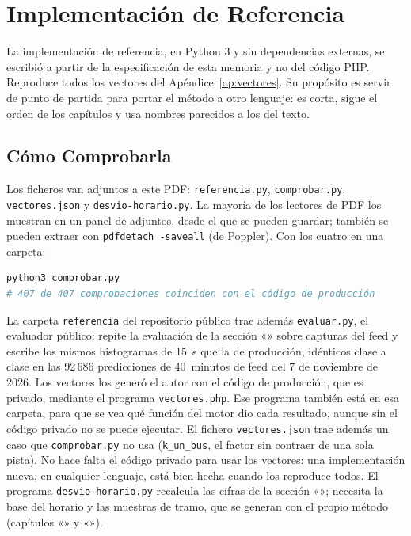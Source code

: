\chapter{Implementación de Referencia}
\label{ap:referencia}

La implementación de referencia, en Python 3 y sin dependencias externas, se escribió a partir de la especificación de
esta memoria y no del código PHP. Reproduce todos los vectores del Apéndice~\ref{ap:vectores}. Su propósito es servir
de punto de partida para portar el método a otro lenguaje: es corta, sigue el orden de los capítulos y usa nombres parecidos a los
del texto.

\section{Cómo Comprobarla}

Los ficheros van adjuntos a este PDF: \texttt{referencia.py}, \texttt{comprobar.py}, \texttt{vectores.json} y
\texttt{desvio-horario.py}. La mayoría de los lectores de PDF los muestran en un panel de adjuntos, desde el que se
pueden guardar; también se pueden extraer con \texttt{pdfdetach -saveall} (de Poppler). Con los cuatro en una carpeta:

\begin{lstlisting}[language=bash,numbers=none]
python3 comprobar.py
# 407 de 407 comprobaciones coinciden con el código de producción
\end{lstlisting}

\noindent La carpeta \texttt{referencia} del repositorio público trae además \texttt{evaluar.py}, el evaluador
público: repite la evaluación de la sección «» sobre capturas del feed y escribe los mismos
histogramas de 15~s que la de producción, idénticos clase a clase en las 92\,686 predicciones de 40~minutos de feed
del 7 de noviembre de 2026. Los vectores los generó el autor con el código de producción, que es privado, mediante el
programa \texttt{vectores.php}. Ese programa también está en esa carpeta, para que se vea qué función del motor dio
cada resultado, aunque sin el código privado no se puede ejecutar. El fichero \texttt{vectores.json} trae además un
caso que \texttt{comprobar.py} no usa (\texttt{k\_un\_bus}, el factor sin contraer de una sola pista). No hace falta
el código privado para usar los vectores: una implementación nueva, en cualquier lenguaje, está bien hecha cuando los
reproduce todos. El
programa \texttt{desvio-horario.py} recalcula las cifras de la sección «»; necesita la base del
horario y las muestras de tramo, que se generan con el propio método (capítulos «»
y «»).

